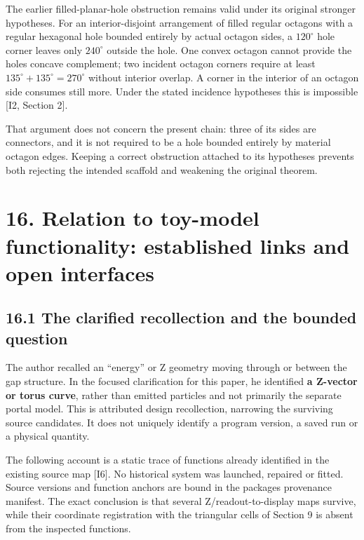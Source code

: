 \documentclass[
  11pt,
  a4paper,
]{article}
\begin{document}
The earlier filled-planar-hole obstruction remains valid under its original stronger hypotheses. For an interior-disjoint arrangement of filled regular octagons with a regular hexagonal hole bounded entirely by actual octagon sides, a \(120^\circ\) hole corner leaves only \(240^\circ\) outside the hole. One convex octagon cannot provide the hole\textquotesingle s concave complement; two incident octagon corners require at least \(135^\circ+135^\circ=270^\circ\) without interior overlap. A corner in the interior of an octagon side consumes still more. Under the stated incidence hypotheses this is impossible {[}I2, Section 2{]}.

That argument does not concern the present chain: three of its sides are connectors, and it is not required to be a hole bounded entirely by material octagon edges. Keeping a correct obstruction attached to its hypotheses prevents both rejecting the intended scaffold and weakening the original theorem.

\section{16. Relation to toy-model functionality: established links and open interfaces}\label{relation-to-toy-model-functionality-established-links-and-open-interfaces}

\subsection{16.1 The clarified recollection and the bounded question}\label{the-clarified-recollection-and-the-bounded-question}

The author recalled an ``energy'' or Z geometry moving through or between the gap structure. In the focused clarification for this paper, he identified \textbf{a Z-vector or torus curve}, rather than emitted particles and not primarily the separate portal model. This is attributed design recollection, narrowing the surviving source candidates. It does not uniquely identify a program version, a saved run or a physical quantity.

The following account is a static trace of functions already identified in the existing source map {[}I6{]}. No historical system was launched, repaired or fitted. Source versions and function anchors are bound in the package\textquotesingle s provenance manifest. The exact conclusion is that several Z/readout-to-display maps survive, while their coordinate registration with the triangular cells of Section 9 is absent from the inspected functions.
\end{document}
